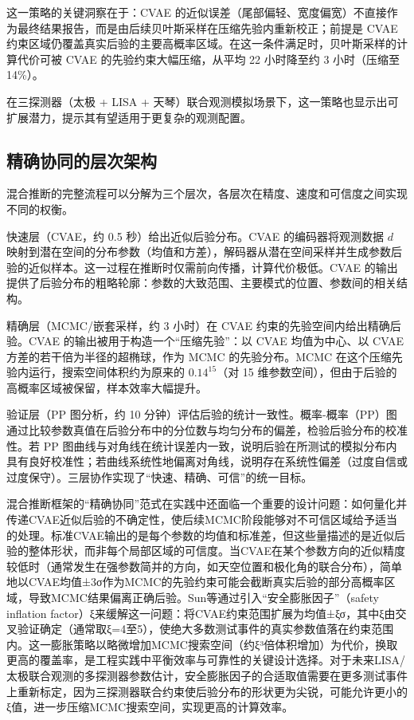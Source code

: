这一策略的关键洞察在于：CVAE 的近似误差（尾部偏轻、宽度偏宽）不直接作为最终结果报告，而是由后续贝叶斯采样在压缩先验内重新校正；前提是 CVAE 约束区域仍覆盖真实后验的主要高概率区域。在这一条件满足时，贝叶斯采样的计算代价可被 CVAE 的先验约束大幅压缩，从平均 22 小时降至约 3 小时（压缩至 14\%）。

在三探测器（太极 + LISA + 天琴）联合观测模拟场景下，这一策略也显示出可扩展潜力，提示其有望适用于更复杂的观测配置。

\subsection{精确协同的层次架构}

混合推断的完整流程可以分解为三个层次，各层次在精度、速度和可信度之间实现不同的权衡。

快速层（CVAE，约 0.5 秒）给出近似后验分布。CVAE 的编码器将观测数据 $d$ 映射到潜在空间的分布参数（均值和方差），解码器从潜在空间采样并生成参数后验的近似样本。这一过程在推断时仅需前向传播，计算代价极低。CVAE 的输出提供了后验分布的粗略轮廓：参数的大致范围、主要模式的位置、参数间的相关结构。

精确层（MCMC/嵌套采样，约 3 小时）在 CVAE 约束的先验空间内给出精确后验。CVAE 的输出被用于构造一个“压缩先验”：以 CVAE 均值为中心、以 CVAE 方差的若干倍为半径的超椭球，作为 MCMC 的先验分布。MCMC 在这个压缩先验内运行，搜索空间体积约为原来的 $0.14^{15}$（对 15 维参数空间），但由于后验的高概率区域被保留，样本效率大幅提升。

验证层（PP 图分析，约 10 分钟）评估后验的统计一致性。概率-概率（PP）图通过比较参数真值在后验分布中的分位数与均匀分布的偏差，检验后验分布的校准性。若 PP 图曲线与对角线在统计误差内一致，说明后验在所测试的模拟分布内具有良好校准性；若曲线系统性地偏离对角线，说明存在系统性偏差（过度自信或过度保守）。三层协作实现了“快速、精确、可信”的统一目标。

混合推断框架的“精确协同”范式在实践中还面临一个重要的设计问题：如何量化并传递CVAE近似后验的不确定性，使后续MCMC阶段能够对不可信区域给予适当的处理。标准CVAE输出的是每个参数的均值和标准差，但这些量描述的是近似后验的整体形状，而非每个局部区域的可信度。当CVAE在某个参数方向的近似精度较低时（通常发生在强参数简并的方向，如天空位置和极化角的联合分布），简单地以CVAE均值±3σ作为MCMC的先验约束可能会截断真实后验的部分高概率区域，导致MCMC结果偏离正确后验。Sun等通过引入“安全膨胀因子”（safety inflation factor）ξ来缓解这一问题：将CVAE约束范围扩展为均值±ξσ，其中ξ由交叉验证确定（通常取ξ=4至5），使绝大多数测试事件的真实参数值落在约束范围内。这一膨胀策略以略微增加MCMC搜索空间（约ξ³倍体积增加）为代价，换取更高的覆盖率，是工程实践中平衡效率与可靠性的关键设计选择。对于未来LISA/太极联合观测的多探测器参数估计，安全膨胀因子的合适取值需要在更多测试事件上重新标定，因为三探测器联合约束使后验分布的形状更为尖锐，可能允许更小的ξ值，进一步压缩MCMC搜索空间，实现更高的计算效率。

